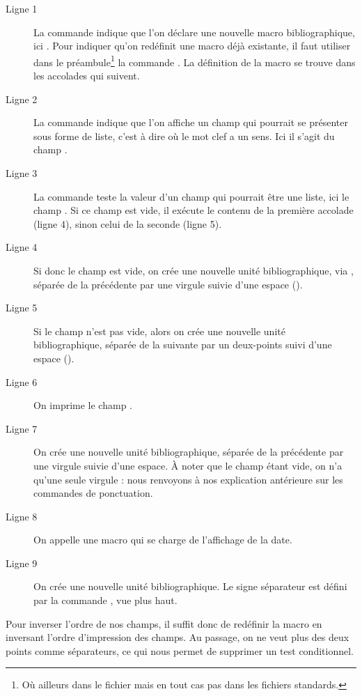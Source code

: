 \begin{description}
\item[Ligne 1] La commande  indique que l'on déclare une nouvelle macro bibliographique, ici . Pour indiquer qu'on redéfinit une macro déjà existante, il faut utiliser dans le préambule\footnote{Où ailleurs dans le fichier  mais en tout cas pas dans les fichiers standards.} la commande . La définition de la macro se trouve dans les accolades qui suivent.
\item[Ligne 2] La commande  indique que l'on affiche un champ qui pourrait se présenter sous forme de liste, c'est à dire où le mot clef  a un sens. Ici il s'agit du champ .
\item[Ligne 3] La commande  teste la valeur d'un champ qui pourrait être une liste, ici le champ . Si ce champ est vide, il exécute le contenu de la première accolade (ligne 4), sinon celui de la seconde (ligne 5).
\item[Ligne 4] Si donc le champ  est vide, on crée une nouvelle unité bibliographique, via  ,\label{unitepersonalisee} séparée de la précédente par une virgule suivie d'une espace ().
\item[Ligne 5] Si le champ  n'est pas vide, alors on crée une nouvelle unité bibliographique, séparée de la suivante par un deux-points suivi d'une espace ().
\item[Ligne 6] On imprime le champ .
\item[Ligne 7] On crée une nouvelle unité bibliographique, séparée de la précédente par une virgule suivie d'une espace. À noter que le champ  étant vide, on n'a qu'une seule virgule : nous renvoyons à nos explication antérieure sur les commandes de ponctuation.
\item[Ligne 8] On appelle une macro qui se charge de l'affichage de la date.
\item[Ligne 9] On crée une nouvelle unité bibliographique. Le signe séparateur est défini par la commande , vue plus haut.
\end{description}

Pour inverser l'ordre de nos champs, il suffit donc de redéfinir la macro en inversant l'ordre d'impression des champs. Au passage, on ne veut plus des deux points comme séparateurs, ce qui nous permet de supprimer un test conditionnel.


